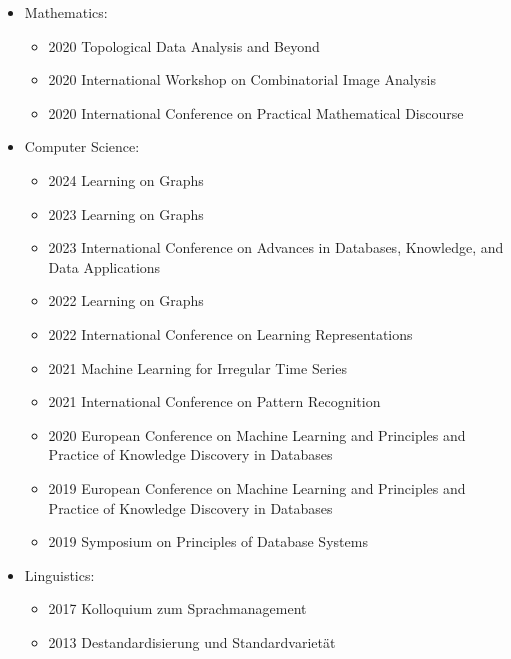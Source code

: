 \documentclass[a4paper, 11pt]{article}
\newcommand{\years}[1]{\marginnote{\scriptsize #1}}
\begin{document}
\years{Conferences}
\vspace{-10pt}
\begin{itemize}[noitemsep, leftmargin=*]
	\item Mathematics:
		\begin{itemize}[noitemsep, leftmargin=*]
			\item 2020 Topological Data Analysis and Beyond 
			\item 2020 International Workshop on Combinatorial Image Analysis 
			\item 2020 International Conference on Practical Mathematical Discourse 
		\end{itemize}
	\item Computer Science:
		\begin{itemize}[noitemsep, leftmargin=*]
			\item 2024 Learning on Graphs 
			\item 2023 Learning on Graphs 
			\item 2023 International Conference on Advances in Databases, Knowledge, and Data Applications 
			\item 2022 Learning on Graphs 
			\item 2022 International Conference on Learning Representations 
			\item 2021 Machine Learning for Irregular Time Series 
			\item 2021 International Conference on Pattern Recognition 
			\item 2020 European Conference on Machine Learning and Principles and Practice of Knowledge Discovery in Databases 
			\item 2019 European Conference on Machine Learning and Principles and Practice of Knowledge Discovery in Databases 
			\item 2019 Symposium on Principles of Database Systems 
		\end{itemize}
	\item Linguistics:
		\begin{itemize}[noitemsep, leftmargin=*]
			\item 2017 Kolloquium zum Sprachmanagement 
			\item 2013 Destandardisierung und Standardvarietät 
		\end{itemize}
\end{itemize}
\vspace{10pt}
\end{document}
